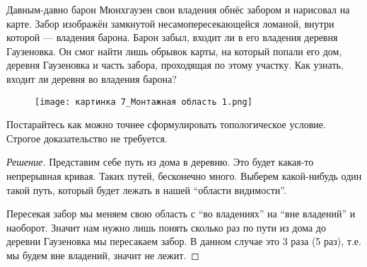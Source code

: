 \documentclass[10pt]{article}
\begin{document}
\date{21 декабря 2024}

\begin{tasks}
    \item Давным-давно барон Мюнхгаузен свои владения обнёс забором и нарисовал на карте. Забор изображён замкнутой несамопересекающейся ломаной, внутри которой — владения барона. Барон забыл, входит ли в его владения деревня Гаузеновка. Он смог найти лишь обрывок карты, на который попали его дом, деревня Гаузеновка и часть забора, проходящая по этому участку. Как узнать, входит ли деревня во владения барона?
    
    \begin{figure}[ht]
        \centering
        \texttt{[image: картинка 7\_Монтажная область 1.png]}
    \end{figure}
    
    Постарайтесь как можно точнее сформулировать топологическое условие. Строгое доказательство не требуется.

    \begin{proof}
        [Решение]
        Представим себе путь из дома в деревню. Это будет какая-то непрерывная кривая. Таких путей, бесконечно много. Выберем какой-нибудь один такой путь, который будет лежать в нашей ``области видимости''.
        
        Пересекая забор мы меняем свою область с ``во владениях'' на ``вне владений'' и наоборот. Значит нам нужно лишь понять сколько раз по пути из дома до деревни Гаузеновка мы пересакаем забор. В данном случае это 3 раза (5 раз), т.е. мы будем вне владений, значит не лежит.
    \end{proof}


\end{tasks}
\end{document}
